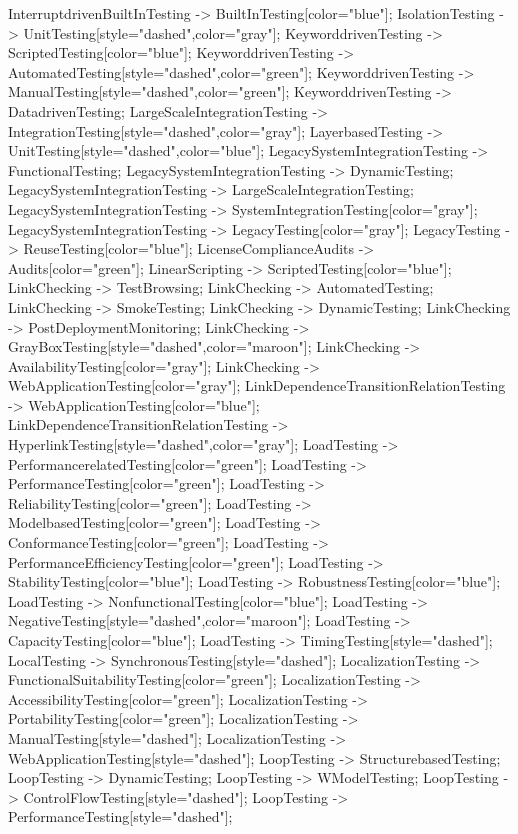 \documentclass{article}
\begin{document}
{InterruptdrivenBuiltInTesting -> BuiltInTesting[color="blue"];
IsolationTesting -> UnitTesting[style="dashed",color="gray"];
KeyworddrivenTesting -> ScriptedTesting[color="blue"];
KeyworddrivenTesting -> AutomatedTesting[style="dashed",color="green"];
KeyworddrivenTesting -> ManualTesting[style="dashed",color="green"];
KeyworddrivenTesting -> DatadrivenTesting;
LargeScaleIntegrationTesting -> IntegrationTesting[style="dashed",color="gray"];
LayerbasedTesting -> UnitTesting[style="dashed",color="blue"];
LegacySystemIntegrationTesting -> FunctionalTesting;
LegacySystemIntegrationTesting -> DynamicTesting;
LegacySystemIntegrationTesting -> LargeScaleIntegrationTesting;
LegacySystemIntegrationTesting -> SystemIntegrationTesting[color="gray"];
LegacySystemIntegrationTesting -> LegacyTesting[color="gray"];
LegacyTesting -> ReuseTesting[color="blue"];
LicenseComplianceAudits -> Audits[color="green"];
LinearScripting -> ScriptedTesting[color="blue"];
LinkChecking -> TestBrowsing;
LinkChecking -> AutomatedTesting;
LinkChecking -> SmokeTesting;
LinkChecking -> DynamicTesting;
LinkChecking -> PostDeploymentMonitoring;
LinkChecking -> GrayBoxTesting[style="dashed",color="maroon"];
LinkChecking -> AvailabilityTesting[color="gray"];
LinkChecking -> WebApplicationTesting[color="gray"];
LinkDependenceTransitionRelationTesting -> WebApplicationTesting[color="blue"];
LinkDependenceTransitionRelationTesting -> HyperlinkTesting[style="dashed",color="gray"];
LoadTesting -> PerformancerelatedTesting[color="green"];
LoadTesting -> PerformanceTesting[color="green"];
LoadTesting -> ReliabilityTesting[color="green"];
LoadTesting -> ModelbasedTesting[color="green"];
LoadTesting -> ConformanceTesting[color="green"];
LoadTesting -> PerformanceEfficiencyTesting[color="green"];
LoadTesting -> StabilityTesting[color="blue"];
LoadTesting -> RobustnessTesting[color="blue"];
LoadTesting -> NonfunctionalTesting[color="blue"];
LoadTesting -> NegativeTesting[style="dashed",color="maroon"];
LoadTesting -> CapacityTesting[color="blue"];
LoadTesting -> TimingTesting[style="dashed"];
LocalTesting -> SynchronousTesting[style="dashed"];
LocalizationTesting -> FunctionalSuitabilityTesting[color="green"];
LocalizationTesting -> AccessibilityTesting[color="green"];
LocalizationTesting -> PortabilityTesting[color="green"];
LocalizationTesting -> ManualTesting[style="dashed"];
LocalizationTesting -> WebApplicationTesting[style="dashed"];
LoopTesting -> StructurebasedTesting;
LoopTesting -> DynamicTesting;
LoopTesting -> WModelTesting;
LoopTesting -> ControlFlowTesting[style="dashed"];
LoopTesting -> PerformanceTesting[style="dashed"];
}
\end{document}
